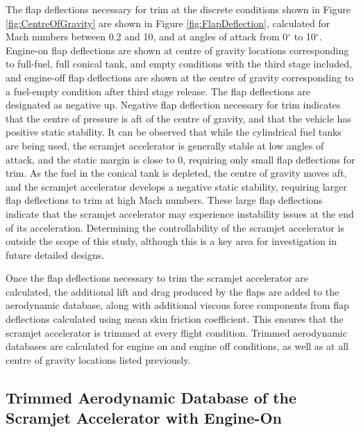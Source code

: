 		The flap deflections necessary for trim at the discrete conditions shown in Figure \ref{fig:CentreOfGravity} are shown in Figure \ref{fig:FlapDeflection}, calculated for Mach numbers between 0.2 and 10, and at angles of attack from 0$^\circ$ to 10$^\circ$. Engine-on flap deflections are shown at centre of gravity locations corresponding to full-fuel, full conical tank, and empty conditions with the third stage included, and engine-off flap deflections are shown at the centre of gravity corresponding to a fuel-empty condition after third stage release. 
		The flap deflections are designated as negative up. Negative flap deflection necessary for trim indicates that the centre of pressure is aft of the centre of gravity, and that the vehicle has positive static stability.
		It can be observed that while the cylindrical fuel tanks are being used, the scramjet accelerator is generally stable at low angles of attack, and the static margin is close to 0, requiring only small flap deflections for trim. As the fuel in the conical tank is depleted, the centre of gravity moves aft, and the scramjet accelerator develops a negative static stability, requiring larger flap deflections to trim at high Mach numbers. These large flap deflections indicate that the scramjet accelerator may experience instability issues at the end of its acceleration. Determining the controllability of the scramjet accelerator is outside the scope of this study, although this is a key area for investigation in future detailed designs. 
		
		
		  Once the flap deflections necessary to trim the scramjet accelerator are calculated, the additional lift and drag produced by the flaps are added to the aerodynamic database, along with additional viscous force components from flap deflections calculated using mean skin friction coefficient. This ensures that the scramjet accelerator is trimmed at every flight condition.
		  Trimmed aerodynamic databases are calculated for engine on and engine off conditions, as well as at all centre of gravity locations listed previously. 
		
		
		
		
		
		
		
		\subsection{Trimmed Aerodynamic Database of the Scramjet Accelerator with Engine-On}\label{sec:trimmedongineon}

